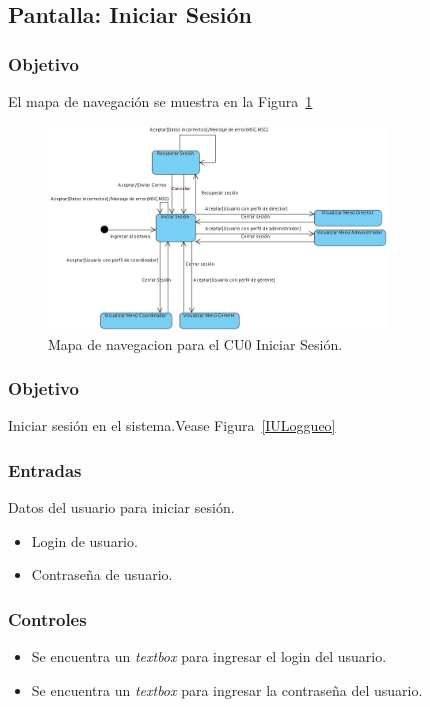 \subsection{Pantalla: Iniciar Sesión}
\subsubsection{Objetivo}
	El mapa de navegación se muestra en la Figura~\ref{fig:mapaNavegacionCU0}

   \begin{figure}[hbpt!]
 		\centering
 			\includegraphics[width=0.8\textwidth]{images/cu0/MapaNavegacion.jpg}
 		\caption{Mapa de navegacion para el CU0 Iniciar Sesión.}
		\label{fig:mapaNavegacionCU0}
 	\end{figure}
\subsubsection{Objetivo}
Iniciar sesión en el sistema.Vease Figura~\ref{IULoggueo}


\subsubsection{Entradas}
Datos del usuario para iniciar sesión.
\begin{itemize}
\item Login de usuario.
\item Contraseña de usuario.
\end{itemize}

\subsubsection{Controles}
\begin{itemize}
 \item Se encuentra un \textit{textbox} para ingresar el login del usuario.
 \item Se encuentra un \textit{textbox} para ingresar la contraseña del usuario.
\end{itemize}

